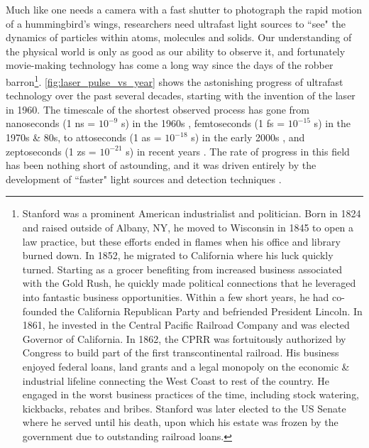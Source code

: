 Much like one needs a camera with a fast shutter to photograph the rapid motion of a hummingbird's wings, researchers need ultrafast light sources to ``see" the dynamics of particles within atoms, molecules and solids. Our understanding of the physical world is only as good as our ability to observe it, and fortunately movie-making technology has come a long way since the days of the robber barron\footnote{Stanford was a prominent American industrialist and politician. Born in 1824 and raised outside of Albany, NY, he moved to Wisconsin in 1845 to open a law practice, but these efforts ended in flames when his office and library burned down. In 1852, he migrated to California where his luck quickly turned. Starting as a grocer benefiting from increased business associated with the Gold Rush, he quickly made political connections that he leveraged into fantastic business opportunities. Within a few short years, he had co-founded the California Republican Party and befriended President Lincoln. In 1861, he invested in the Central Pacific Railroad Company and was elected Governor of California. In 1862, the CPRR was fortuitously authorized by Congress to build part of the first transcontinental railroad. His business enjoyed federal loans, land grants and a legal monopoly on the economic \& industrial lifeline connecting the West Coast to rest of the country. He engaged in the worst business practices of the time, including stock watering, kickbacks, rebates and bribes. Stanford was later elected to the US Senate where he served until his death, upon which his estate was frozen by the government due to outstanding railroad loans.}. \cref{fig:laser_pulse_vs_year} shows the astonishing progress of ultrafast technology over the past several decades, starting with the invention of the laser in 1960. The timescale of the shortest observed process has gone from nanoseconds ({1 ns = $10^{-9}$ s}) in the 1960s \cite{krauszAttosecondMetrologyElectron2014}, femtoseconds ({1 fs = $10^{-15}$ s}) in the 1970s \& 80s, to attoseconds ({1 as = $10^{-18}$ s}) in the early 2000s \cite{hentschelAttosecondMetrology2001,krauszFemtochemistryAttophysics2001}, and zeptoseconds ({1 zs = $10^{-21}$ s}) in recent years \cite{ossianderAttosecondCorrelationDynamics2017,grundmannZeptosecondBirthTime2020}. The rate of progress in this field has been nothing short of astounding, and it was driven entirely by the development of ``faster" light sources and detection techniques \cite{kartnerFemtosecondLaserDevelopment2005}.

